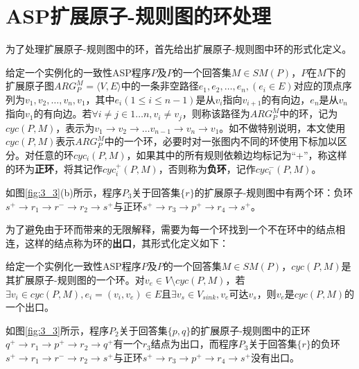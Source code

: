 \section{ASP扩展原子-规则图的环处理}
为了处理扩展原子-规则图中的环，首先给出扩展原子-规则图中环的形式化定义。
\begin{definition}
    给定一个实例化的一致性ASP程序$P$及$P$的一个回答集$M \in SM(P)$，$P$在$M$下的扩展原子图$ARG_P^M= \langle V, E \rangle$中的一条非空路径$e_1, e_2, \ldots, e_n, (e_i \in E)$对应的顶点序列为$v_1, v_2, \ldots, v_n, v_1$，其中$e_i (1 \le i \le n-1)$是从$v_i$指向$v_{i+1}$的有向边，$e_n$是从$v_n$指向$v_1$的有向边。若$\forall i \neq j \in 1 \ldots n, v_i \neq v_j$，则称该路径为$ARG_P^M$中的环，记为$cyc(P,M)$，表示为$v_1 \rightarrow v_2 \rightarrow \ldots v_{n-1} \rightarrow v_n \rightarrow v_1$。如不做特别说明，本文使用$cyc(P,M)$表示$ARG_P^M$中的一个环，必要时对一张图内不同的环使用下标加以区分。对任意的环$cyc_i(P,M)$，如果其中的所有规则依赖边均标记为“+”，称这样的环为\textbf{正环}，将其记作$cyc_i^+(P,M)$，否则称为\textbf{负环}，记作$cyc_i^-(P,M)$。
\end{definition}

\begin{example}
    如图\ref{fig:3_3}(b)所示，程序\hyperref[prg:p3]{$P_3$}关于回答集$\{r\}$的扩展原子-规则图中有两个环：负环$s^+ \rightarrow r_1 \rightarrow r^- \rightarrow r_2 \rightarrow s^+$与正环$s^+ \rightarrow r_3 \rightarrow p^+ \rightarrow r_4 \rightarrow s^+$。
\end{example}

为了避免由于环而带来的无限解释，需要为每一个环找到一个不在环中的结点相连，这样的结点称为环的\textbf{出口}，其形式化定义如下：

\begin{definition}
    给定一个实例化一致性ASP程序$P$及$P$的一个回答集$M \in SM(P)$，$cyc(P, M)$是其扩展原子-规则图的一个环。对$v_e \in V \setminus cyc(P, M)$，若$\exists v_i \in cyc(P,M), e_i=(v_i, v_e) \in E$且$\exists v_s \in V_{sink}, v_e$可达$v_s$，则$v_e$是$cyc(P, M)$的一个出口。
\end{definition}

\begin{example}
    如图\ref{fig:3_3}所示，程序\hyperref[prg:p2]{$P_2$}关于回答集$\{p, q\}$的扩展原子-规则图中的正环$q^+ \rightarrow r_1 \rightarrow p^+ \rightarrow r_2 \rightarrow q^+$有一个$r_3$结点为出口，而程序\hyperref[prg:p3]{$P_3$}关于回答集$\{r\}$的负环$s^+ \rightarrow r_1 \rightarrow r^- \rightarrow r_2 \rightarrow s^+$与正环$s^+ \rightarrow r_3 \rightarrow p^+ \rightarrow r_4 \rightarrow s^+$没有出口。
\end{example}

